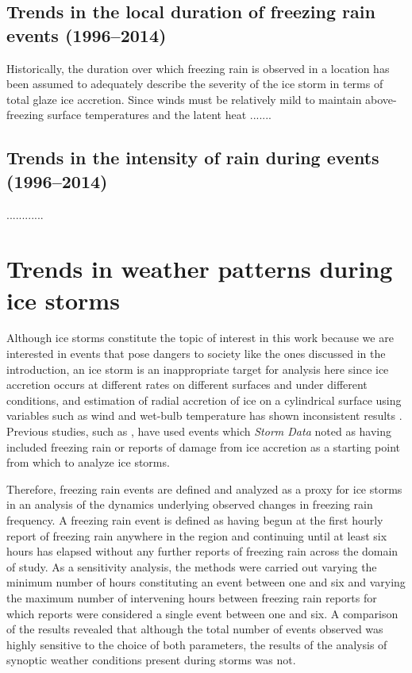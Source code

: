 \documentclass[twocol]{ametsoc}
\begin{document}
\subsection{Trends in the local duration of freezing rain events (1996--2014)}
Historically, the duration over which freezing rain is observed in a location has been assumed to adequately describe the severity of the ice storm in terms of total glaze ice accretion. Since winds must be relatively mild to maintain above-freezing surface temperatures and the latent heat .......

\subsection{Trends in the intensity of rain during events (1996--2014)}
............

\section{Trends in weather patterns during ice storms}
Although ice storms constitute the topic of interest in this work because we are interested in events that pose dangers to society like the ones discussed in the introduction, an ice storm is an inappropriate target for analysis here since ice accretion occurs at different rates on different surfaces and under different conditions, and estimation of radial accretion of ice on a cylindrical surface using variables such as wind and wet-bulb temperature has shown inconsistent results \citep{add a citation for this}. Previous studies, such as \citet{swaminathan2015modeling}, have used events which \textit{Storm Data} noted as having included freezing rain or reports of damage from ice accretion as a starting point from which to analyze ice storms. 

Therefore, freezing rain events are defined and analyzed as a proxy for ice storms in an analysis of the dynamics underlying observed changes in freezing rain frequency. A freezing rain event is defined as having begun at the first hourly report of freezing rain anywhere in the region and continuing until at least six hours has elapsed without any further reports of freezing rain across the domain of study. As a sensitivity analysis, the methods were carried out varying the minimum number of hours constituting an event between one and six and varying the maximum number of intervening hours between freezing rain reports for which reports were considered a single event between one and six. A comparison of the results revealed that although the total number of events observed was highly sensitive to the choice of both parameters, the results of the analysis of synoptic weather conditions present during storms was not.
\end{document}
